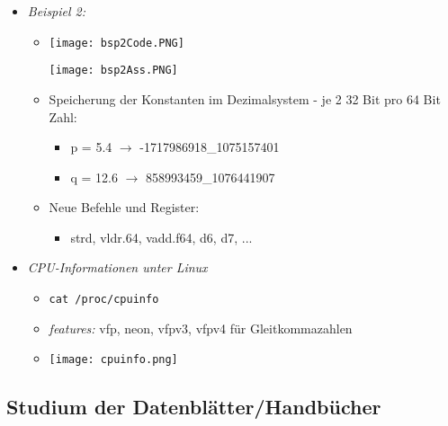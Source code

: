 \begin{itemize}
        \item \textit{Beispiel 2:}
            \begin{itemize}
                \item[]
                    \begin{minipage}{0.5\textwidth}
                        \texttt{[image: bsp2Code.PNG]}
                    \end{minipage}
                    \begin{minipage}{0.4\textwidth}
                        \texttt{[image: bsp2Ass.PNG]}
                    \end{minipage}
                \item Speicherung der Konstanten im Dezimalsystem - je 2 32 Bit pro 64 Bit Zahl:
                    \begin{itemize}
                        \item[] p = 5.4 $\rightarrow$ -1717986918\_1075157401
                        \item[] q = 12.6 $\rightarrow$ 858993459\_1076441907
                    \end{itemize}
                \item Neue Befehle und Register:
                    \begin{itemize}
                        \item[] strd, vldr.64, vadd.f64, d6, d7, ...
                    \end{itemize}
            \end{itemize}

        \item \textit{CPU-Informationen unter Linux}
            \begin{itemize}
                \item \texttt{cat /proc/cpuinfo}
                \item \textit{features:} vfp, neon, vfpv3, vfpv4 für Gleitkommazahlen
                \item[] \texttt{[image: cpuinfo.png]}
            \end{itemize}
        
    \end{itemize}

\subsection{Studium der Datenblätter/Handbücher}

